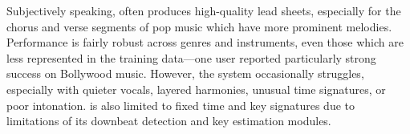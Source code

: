 Subjectively speaking, \sheetsage{} often produces high-quality lead sheets, especially for the chorus and verse segments of pop music which have more prominent melodies. 
Performance is fairly robust across genres and instruments, even those which are less represented in the training data---one user reported particularly strong success on Bollywood music. 
However, the system occasionally struggles, especially with quieter vocals, layered harmonies, unusual time signatures, or poor intonation. 
\sheetsage{} is also limited to fixed time and key signatures due to limitations of its downbeat detection and key estimation modules.
